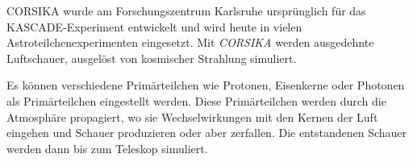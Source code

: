 CORSIKA wurde am Forschungszentrum Karlsruhe ursprünglich für das KASCADE-Experiment entwickelt und wird heute in vielen Astroteilchenexperimenten eingesetzt.
Mit \textit{CORSIKA} werden ausgedehnte Luftschauer, ausgelöst von kosmischer Strahlung simuliert.

Es können verschiedene Primärteilchen wie Protonen, Eisenkerne oder Photonen als Primärteilchen eingestellt werden.
Diese Primärteilchen werden durch die Atmosphäre propagiert, wo sie Wechselwirkungen mit den Kernen der Luft eingehen und Schauer produzieren oder aber zerfallen.
Die entstandenen Schauer werden dann bis zum Teleskop simuliert.




